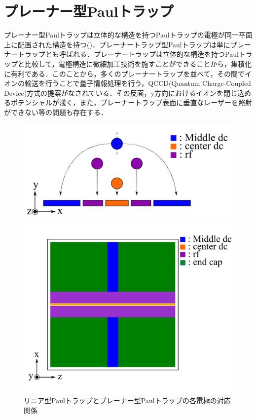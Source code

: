 \section{プレーナー型Paulトラップ}
プレーナー型Paulトラップは立体的な構造を持つPaulトラップの電極が同一平面上に配置された構造を持つ()．プレーナートラップ型Paulトラップは単にプレーナートラップとも呼ばれる．プレーナートラップは立体的な構造を持つPaulトラップと比較して，電極構造に微細加工技術を施すことができることから，集積化に有利である．このことから，多くのプレーナートラップを並べて，その間でイオンの輸送を行うことで量子情報処理を行う，QCCD(Quantum Charge-Coupled Device)方式の提案\cite{Kielpinski_2002}がなされている．その反面，y方向におけるイオンを閉じ込めるポテンシャルが浅く，また，プレーナートラップ表面に垂直なレーザーを照射ができない等の問題も存在する．
\begin{figure}[h]
	\begin{center}
		\begin{minipage}{0.48\linewidth}
			\begin{center}
			\includegraphics[width = 0.8\columnwidth]{./theory/figure/PaulTrap_3Dto2D_3DTrap.png}
			\end{center}
		\end{minipage}
		\begin{minipage}{0.48\linewidth}
			\begin{center}
			\includegraphics[width = 0.8\columnwidth]{./theory/figure/PaulTrap_3Dto2D_2DTrap.png}
			\end{center}
		\end{minipage}
	\end{center}
	\caption{リニア型Paulトラップとプレーナー型Paulトラップの各電極の対応関係}
	\label{fig:3D_to_2D}
\end{figure}

